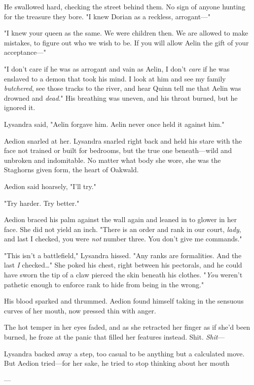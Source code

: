 He swallowed hard, checking the street behind them. No sign of anyone hunting for the treasure they bore. "I knew Dorian as a reckless, arrogant---"

"I knew your queen as the same. We were children then. We are allowed to make mistakes, to figure out who we wish to be. If you will allow Aelin the gift of your acceptance---"

"I don't care if he was as arrogant and vain as Aelin, I don't
\emph{care} if he was enslaved to a demon that took his mind. I look at him and see my family \emph{butchered}, see those tracks to the river, and hear Quinn tell me that Aelin was drowned and \emph{dead}." His breathing was uneven, and his throat burned, but he ignored it.

Lysandra said, "Aelin forgave him. Aelin never once held it against him."

Aedion snarled at her. Lysandra snarled right back and held his stare with the face not trained or built for bedrooms, but the true one beneath---wild and unbroken and indomitable. No matter what body she wore, she was the Staghorns given form, the heart of Oakwald.

Aedion said hoarsely, "I'll try."

"Try harder. Try better."

Aedion braced his palm against the wall again and leaned in to glower in her face. She did not yield an inch. "There is an order and rank in our court, \emph{lady}, and last I checked, you were \emph{not} number three. You don't give me commands."

"This isn't a battlefield," Lysandra hissed. "Any ranks are formalities. And the last \emph{I} checked\ldots" She poked his chest, right between his pectorals, and he could have sworn the tip of a claw pierced the skin beneath his clothes. "\emph{You} weren't pathetic enough to enforce rank to hide from being in the wrong."

His blood sparked and thrummed. Aedion found himself taking in the sensuous curves of her mouth, now pressed thin with anger.

The hot temper in her eyes faded, and as she retracted her finger as if she'd been burned, he froze at the panic that filled her features instead. Shit. \emph{Shit}---

Lysandra backed away a step, too casual to be anything but a calculated move. But Aedion tried---for her sake, he tried to stop thinking about her mouth

---

